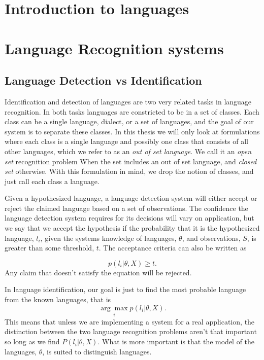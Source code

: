 
\label{sect:Theory}

\chapter{Introduction to languages}

\chapter{Language Recognition systems}

\section{Language Detection vs Identification}
\label{sect:detvsid}

Identification and detection of languages are two very related tasks in language recognition. In both tasks languages are constricted to be in a set of classes. Each class can be a single language, dialect, or a set of languages, and the goal of our system is to separate these classes. In this thesis we will only look at formulations where each class is a single language and possibly one class that consists of all other languages, which we refer to as an \emph{out of set language}. We call it an \emph{open set} recognition problem When the set includes an out of set language, and \emph{closed set} otherwise. With this formulation in mind, we drop the notion of classes, and just call each class a language. 

Given a hypothesized language, a language detection system will either accept or reject the claimed language based on a set of observations. The confidence the language detection system requires for its decisions will vary on application, but we say that we accept the hypothesis if the probability that it is the hypothesized language, $l_i$, given the systems knowledge of languages, $\theta$, and observations, $S$, is greater than some threshold, $t$. The acceptance criteria can also be written as

\begin{equation*}
p(l_i | \theta, X) \geq t.
\end{equation*}
Any claim that doesn't satisfy the equation will be rejected.

 In language identification, our goal is just to find the most probable language from the known languages, that is
\begin{equation*}
\underset{i}{\arg \max} p(l_i | \theta, X).
\end{equation*}
This means that unless we are implementing a system for a real application, the distinction between the two language recognition problems aren't that important so long as we find $P(l_i | \theta, X)$. What is more important is that the model of the languages, $\theta$, is suited to distinguish languages.

